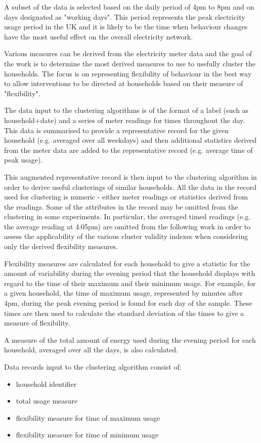 \documentclass[conference]{IEEEtran}
\begin{document}
A subset of the data is selected based on the daily period of 4pm to 8pm and on days designated as "working days". This period represents the peak electricity usage period in the UK and it is likely to be the time when behaviour changes have the most useful effect on the overall electricity network.

Various measures can be derived from the electricity meter data and the goal of the work is to determine the most derived measures to use to usefully cluster the households. The focus is on representing flexibility of behaviour in the best way to allow interventions to be directed at households based on their measure of "flexibility". 

The data input to the clustering algorithms is of the format of a label (such as household+date) and a series of meter readings for times throughout the day. This data is summarised to provide a representative record for the given household (e.g. averaged over all weekdays) and then additional statistics derived from the meter data are added to the representative record (e.g. average time of peak usage).

This augmented representative record is then input to the clustering algorithm in order to derive useful clusterings of similar households. All the data in the record used for clustering is numeric - either meter readings or statistics derived from the readings. Some of the attributes in the record may be omitted from the clustering in some experiments. In particular, the averaged timed readings (e.g. the average reading at 4:05pm) are omitted from the following work in order to assess the applicability of the various cluster validity indexes when considering only the derived flexibility measures.

Flexibility measures are calculated for each household to give a statistic for the amount of variability during the evening period that the household displays with regard to the time of their maximum and their minimum usage. For example, for a given household, the time of maximum usage, represented by minutes after 4pm, during the peak evening period is found for each day of the sample. These times are then used to calculate the standard deviation of the times to give a measure of flexibility.

A measure of the total amount of energy used during the evening period for each household, averaged over all the days, is also calculated.

Data records input to the clustering algorithm consist of:
\begin{itemize}
\item household identifier
\item total usage measure
\item flexibility measure for time of maximum usage
\item flexibility measure for time of minimum usage
\end{itemize}
\end{document}
